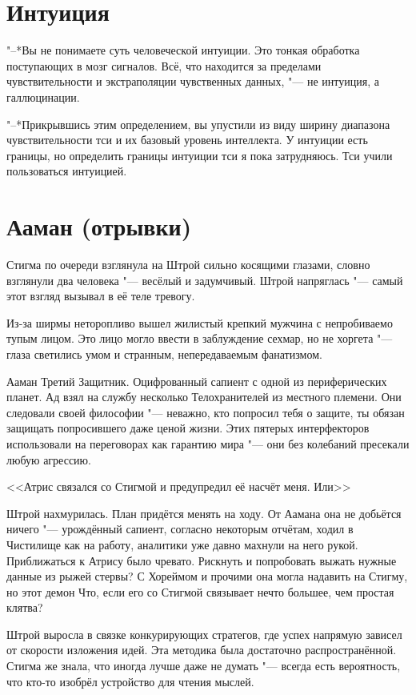 \documentclass[a4paper,10pt,fleqn]{book}
\newcommand{\ldotst}{\so{...}\xspace}
\newcommand{\ldotsq}{\so{?\hbox{\hspace{-.212em}}..}\xspace}
\begin{document}
\section{Интуиция}

"--*Вы не понимаете суть человеческой интуиции.
Это тонкая обработка поступающих в мозг сигналов.
Всё, что находится за пределами чувствительности и экстраполяции чувственных данных, "--- не интуиция, а галлюцинации.

"--*Прикрывшись этим определением, вы упустили из виду ширину диапазона чувствительности тси и их базовый уровень интеллекта.
У интуиции есть границы, но определить границы интуиции тси я пока затрудняюсь.
Тси учили пользоваться интуицией.

\section{Ааман (отрывки)}

Стигма по очереди взглянула на Штрой сильно косящими глазами, словно взглянули два человека "--- весёлый и задумчивый.
Штрой напряглась "--- самый этот взгляд вызывал в её теле тревогу.

Из-за ширмы неторопливо вышел жилистый крепкий мужчина с непробиваемо тупым лицом.
Это лицо могло ввести в заблуждение сехмар, но не хоргета "--- глаза светились умом и странным, непередаваемым фанатизмом.

Ааман Третий Защитник.
Оцифрованный сапиент с одной из периферических планет.
Ад взял на службу несколько Телохранителей из местного племени.
Они следовали своей философии "--- неважно, кто попросил тебя о защите, ты обязан защищать попросившего даже ценой жизни.
Этих пятерых интерфекторов использовали на переговорах как гарантию мира "--- они без колебаний пресекали любую агрессию.

<<Атрис связался со Стигмой и предупредил её насчёт меня.
Или\ldotsq>>

Штрой нахмурилась.
План придётся менять на ходу.
От Аамана она не добьётся ничего "--- урождённый сапиент, согласно некоторым отчётам, ходил в Чистилище как на работу, аналитики уже давно махнули на него рукой.
Приближаться к Атрису было чревато.
Рискнуть и попробовать выжать нужные данные из рыжей стервы?
С Хореймом и прочими она могла надавить на Стигму, но этот демон\ldotst
Что, если его со Стигмой связывает нечто большее, чем простая клятва?

Штрой выросла в связке конкурирующих стратегов, где успех напрямую зависел от скорости изложения идей.
Эта методика была достаточно распространённой.
Стигма же знала, что иногда лучше даже не думать "--- всегда есть вероятность, что кто-то изобрёл устройство для чтения мыслей.
\end{document}
